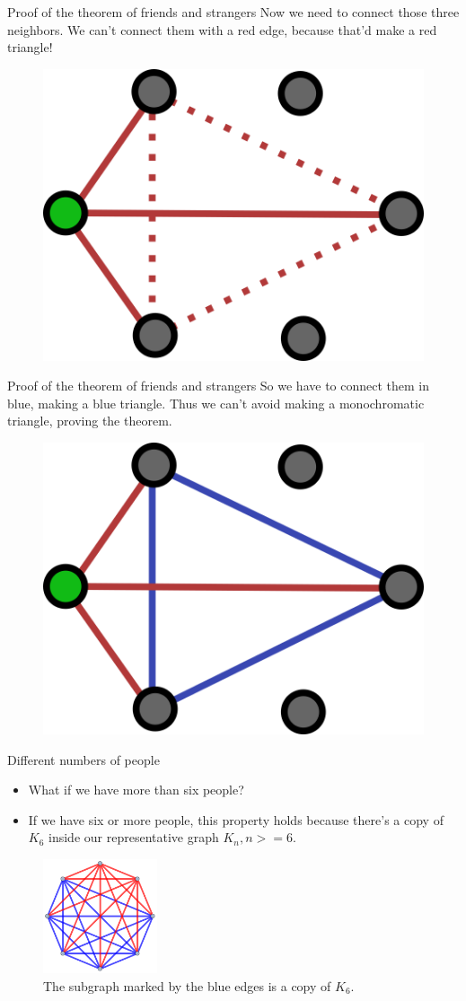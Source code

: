 \documentclass[aspectratio=169]{beamer}
\begin{document}
\begin{frame}{Proof of the theorem of friends and strangers}
    Now we need to connect those three neighbors. We can't connect them with a red edge, because that'd make a red triangle!
    \begin{figure}
        \centering
        \includegraphics[width=0.5\columnwidth]{images/step3.png}
    \end{figure}
\end{frame}

\begin{frame}{Proof of the theorem of friends and strangers}
    So we have to connect them in blue, making a blue triangle. Thus we can't avoid making a monochromatic triangle, proving the theorem.
    \begin{figure}
        \centering
        \includegraphics[width=0.5\columnwidth]{images/step4.png}
    \end{figure}
\end{frame}

\begin{frame}{Different numbers of people}
    \begin{itemize}
        \item What if we have more than six people? \pause
        \item If we have six or more people, this property holds because there's a copy of $K_6$ inside our representative graph $K_n, n>=6$.
    \end{itemize}
    \begin{figure}
        \centering
        \includegraphics[width=0.3\textwidth]{images/r8example.png}
        \caption{The subgraph marked by the blue edges is a copy of $K_6$.}
    \end{figure}
\end{frame}
\end{document}

